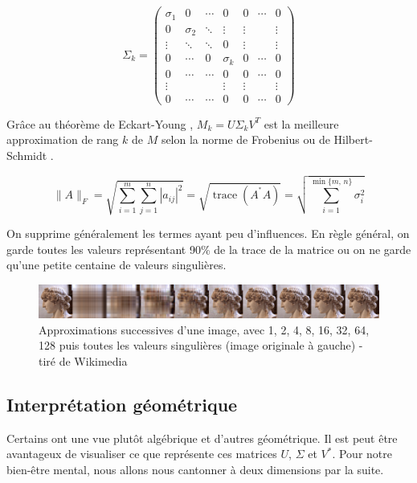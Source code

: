 $$ \Sigma_k =\left( \begin{array}{cccc|ccc}
   \sigma_1 & 0 & \cdots & 0 & 0 & \cdots & 0 \\
   0 & \sigma_2 & \ddots & \vdots & \vdots & & \vdots \\
   \vdots & \ddots & \ddots & 0 & \vdots & & \vdots \\
   0 & \cdots & 0 & \sigma_k & 0 & \cdots & 0 \\ \hline
   0 & \cdots & \cdots & 0 & 0 & \cdots & 0 \\
   \vdots & & & \vdots & \vdots & & \vdots \\
   0 & \cdots & \cdots & 0 & 0 & \cdots & 0
\end{array}\right) $$

Grâce au théorème de Eckart-Young \cite{eckart1936approximation}, $M_{k} = U \Sigma_{k} V^{T}$ est la meilleure approximation de rang $k$ de $M$ selon la norme de Frobenius ou de Hilbert-Schmidt \cite{horn1990norms}.

$$ \|A\|_F=\sqrt{\sum_{i=1}^m\sum_{j=1}^n |a_{ij}|^2}=\sqrt{\operatorname{trace}(A^{{}^*}A)}=\sqrt{\sum_{i=1}^{\min\{m,\,n\}} \sigma_i^2} $$

On supprime généralement les termes ayant peu d'influences. En règle général, on garde toutes les valeurs représentant 90\% de la trace de la matrice ou on ne garde qu'une petite centaine de valeurs singulières.

\begin{figure}[h]
\begin{center}
    \includegraphics[scale=0.15]{Methodologie/Antinous_SVD_approximation.png}
    \caption{Approximations successives d'une image, avec 1, 2, 4, 8, 16, 32, 64, 128 puis toutes les valeurs singulières (image originale à gauche) - tiré de Wikimedia}
\end{center}
\end{figure}

\subsection{Interprétation géométrique}

Certains ont une vue plutôt algébrique et d'autres géométrique. Il est peut être avantageux de visualiser ce que représente ces matrices $U$, $\Sigma$ et $V^{*}$. Pour notre bien-être mental, nous allons nous cantonner à deux dimensions par la suite.

